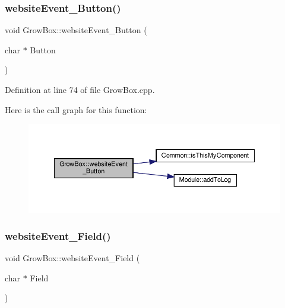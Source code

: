 \mbox{\label{class_grow_box_ad246a22690da3301345b0337aab8258f}} 
\subsubsection{\texorpdfstring{website\+Event\+\_\+\+Button()}{websiteEvent\_Button()}\hspace{0.1cm}{\footnotesize\ttfamily [2/2]}}
{\footnotesize\ttfamily void Grow\+Box\+::website\+Event\+\_\+\+Button (\begin{DoxyParamCaption}\item[{char $\ast$}]{Button }\end{DoxyParamCaption})}



Definition at line 74 of file Grow\+Box.\+cpp.

Here is the call graph for this function\+:
\nopagebreak
\begin{figure}[H]
\begin{center}
\leavevmode
\includegraphics[width=350pt]{class_grow_box_ad246a22690da3301345b0337aab8258f_cgraph}
\end{center}
\end{figure}
\mbox{\label{class_grow_box_a5c5ba0de9289075db990a15a5c0b7634}} 
\subsubsection{\texorpdfstring{website\+Event\+\_\+\+Field()}{websiteEvent\_Field()}\hspace{0.1cm}{\footnotesize\ttfamily [1/2]}}
{\footnotesize\ttfamily void Grow\+Box\+::website\+Event\+\_\+\+Field (\begin{DoxyParamCaption}\item[{char $\ast$}]{Field }\end{DoxyParamCaption})}

